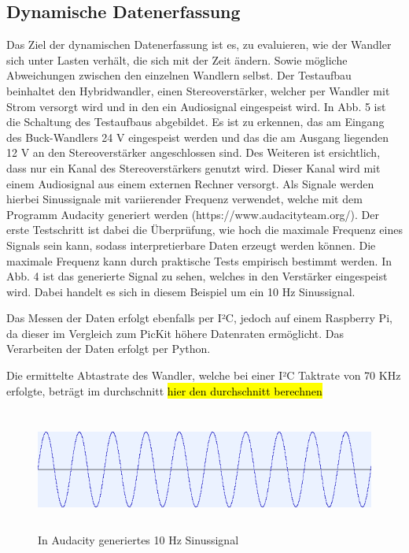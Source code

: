 \subsection{Dynamische Datenerfassung}

Das Ziel der dynamischen Datenerfassung ist es, zu evaluieren, wie der Wandler sich unter Lasten verhält, die sich mit der Zeit ändern. Sowie mögliche Abweichungen zwischen den einzelnen Wandlern selbst. Der Testaufbau beinhaltet den Hybridwandler, einen Stereoverstärker, welcher per Wandler mit Strom versorgt wird und in den ein Audiosignal eingespeist wird. In Abb. 5 ist die Schaltung des Testaufbaus abgebildet. Es ist zu erkennen, das am Eingang des Buck-Wandlers 24 V eingespeist werden und das die am Ausgang liegenden 12 V an den Stereoverstärker angeschlossen sind. Des Weiteren ist ersichtlich, dass nur ein Kanal des Stereoverstärkers genutzt wird. Dieser Kanal wird mit einem Audiosignal aus einem externen Rechner versorgt. Als Signale werden hierbei Sinussignale mit variierender Frequenz verwendet, welche mit dem Programm Audacity generiert werden (https://www.audacityteam.org/). Der erste Testschritt ist dabei die Überprüfung, wie hoch die maximale Frequenz eines Signals sein kann, sodass interpretierbare Daten erzeugt werden können. Die maximale Frequenz kann durch praktische Tests empirisch bestimmt werden. In Abb. 4 ist das generierte Signal zu sehen, welches in den Verstärker eingespeist wird. Dabei handelt es sich in diesem Beispiel um ein 10 Hz Sinussignal. 

Das Messen der Daten erfolgt ebenfalls per I²C, jedoch auf einem Raspberry Pi, da dieser im Vergleich zum PicKit höhere Datenraten ermöglicht. Das Verarbeiten der Daten erfolgt per Python. 

Die ermittelte Abtastrate des Wandler, welche bei einer I²C Taktrate von 70 KHz erfolgte, beträgt im durchschnitt \hl{hier den durchschnitt berechnen}


\begin{figure}
    \centering
    \includegraphics[height= 4cm, width = 12cm]{Pictures/Sinus_Aud.png}
    \caption{In Audacity generiertes 10 Hz Sinussignal}
\end{figure}

